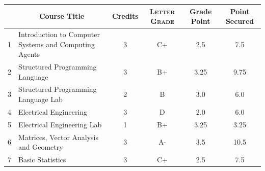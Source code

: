 \documentclass[11pt]{article}
\newcommand*{\numtwo}[1]{\pgfmathprintnumber[
                    fixed, precision=2, fixed zerofill=true]{#1}}
\begin{document}
                \begin{center}
                    \renewcommand{\arraystretch}{1.08}
                    
                \begin{tabular}{|c|l|c|>{\scshape}c|c|c|}
                \hline  \rule[-1ex]{0pt}{3.5ex} {\centering{\bf Course Code}} &  \multicolumn{1}{c|}{\textbf{Course Title}}  & {\bf Credits} & {\bf Letter Grade} & {\bf Grade Point} & {\bf Point Secured}  \\ 
                \hline   1 &  Introduction to Computer Systems and Computing Agents		 & 3 & C+ & 2.5 & 7.5 \\ %
                \hline   2 &  Structured Programming Language		 & 3 & B+ & 3.25 & 9.75 \\ %
                \hline   3 &  Structured Programming Language Lab		 & 2 & B & 3.0 & 6.0 \\ %
                \hline   4 &  Electrical Engineering		 & 3 & D & 2.0 & 6.0 \\ %
                \hline   5 &  Electrical Engineering Lab		 & 1 & B+ & 3.25 & 3.25 \\ %
                \hline   6 &  Matrices, Vector Analysis and Geometry		 & 3 & A- & 3.5 & 10.5 \\ %
                \hline   7 &  Basic Statistics		 & 3 & C+ & 2.5 & 7.5 \\ %

\hline                %
                \end{tabular}
                \end{center}
                \renewcommand{\arraystretch}{1.03}
\end{document}
